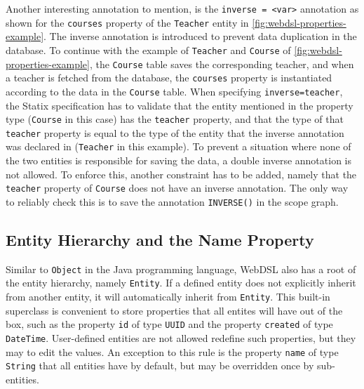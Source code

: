       Another interesting annotation to mention, is the \texttt{inverse = <var>} annotation as shown for the \texttt{courses} property of the \texttt{Teacher} entity in \cref{fig:webdsl-properties-example}. The inverse annotation is introduced to prevent data duplication in the database. To continue with the example of \texttt{Teacher} and \texttt{Course} of \cref{fig:webdsl-properties-example}, the \texttt{Course} table saves the corresponding teacher, and when a teacher is fetched from the database, the \texttt{courses} property is instantiated according to the data in the \texttt{Course} table. When specifying \texttt{inverse=teacher}, the Statix specification has to validate that the entity mentioned in the property type (\texttt{Course} in this case) has the \texttt{teacher} property, and that the type of that \texttt{teacher} property is equal to the type of the entity that the inverse annotation was declared in (\texttt{Teacher} in this example). To prevent a situation where none of the two entities is responsible for saving the data, a double inverse annotation is not allowed. To enforce this, another constraint has to be added, namely that the \texttt{teacher} property of \texttt{Course} does not have an inverse annotation. The only way to reliably check this is to save the annotation \texttt{INVERSE()} in the scope graph.

    \subsection{Entity Hierarchy and the Name Property}

      Similar to \texttt{Object} in the Java programming language, WebDSL also has a root of the entity hierarchy, namely \texttt{Entity}. If a defined entity does not explicitly inherit from another entity, it will automatically inherit from \texttt{Entity}. This built-in superclass is convenient to store properties that all entites will have out of the box, such as the property \texttt{id} of type \texttt{UUID} and the property \texttt{created} of type \texttt{DateTime}. User-defined entities are not allowed redefine such properties, but they may to edit the values. An exception to this rule is the property \texttt{name} of type \texttt{String} that all entities have by default, but may be overridden once by sub-entities.

